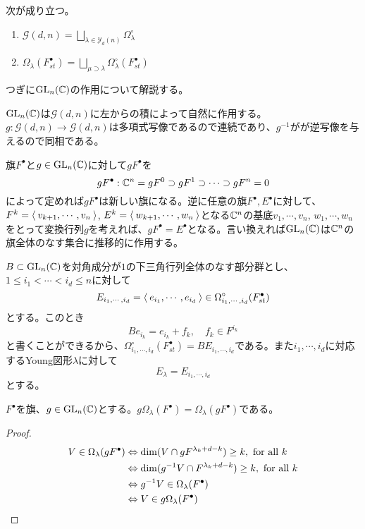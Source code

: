 \documentclass{ltjsreport}
\begin{document}
\begin{cor}
  次が成り立つ。
  \begin{enumerate}
    \item $\mathcal{G}(d,n)=\bigsqcup_{\lambda\in\mathcal{Y}_d(n)}\Omega_{\lambda}^\circ$
    \item $\Omega_{\lambda}(F^\bullet_{st})=\bigsqcup_{\mu\supset\lambda}\Omega_{\lambda}^\circ(F^\bullet_{st})$
  \end{enumerate}
\end{cor}





つぎに$\text{GL}_n(\mathbb{C})$の作用について解説する。

$\text{GL}_n(\mathbb{C})$は$\mathcal{G}(d,n)$に左からの積によって自然に作用する。$g:\mathcal{G}(d,n)\rightarrow\mathcal{G}(d,n)$は多項式写像であるので連続であり、$g^{-1}$がが逆写像を与えるので同相である。

旗$F^\bullet$と$g\in\text{GL}_n(\mathbb{C})$に対して$gF^\bullet$を
\[
gF^\bullet:\mathbb{C}^n=gF^0\supset gF^1\supset\cdots\supset gF^n=0
\]
によって定めれば$gF^\bullet$は新しい旗になる。逆に任意の旗$F^\bullet,E^\bullet$に対して、$F^k=\langle\:v_{k+1},\cdots,v_n\:\rangle$, $E^k=\langle\:w_{k+1},\cdots,w_n\:\rangle$となる$\mathbb{C}^n$の基底$v_1,\cdots,v_n$, $w_1,\cdots,w_n$をとって変換行列$g$を考えれば、$gF^\bullet =E^\bullet$となる。言い換えれば$\text{GL}_n(\mathbb{C})$は$\mathbb{C}^n$の旗全体のなす集合に推移的に作用する。

$B\subset\text{GL}_n(\mathbb{C})$を対角成分が$1$の下三角行列全体のなす部分群とし、$1\leq i_1<\cdots<i_d\leq n$に対して
\[
E_{i_1,\cdots,i_d}=\langle\:e_{i_1},\cdots,e_{i_d}\:\rangle\in\Omega_{i_1,\cdots,i_d}^\circ(F^\bullet_{st}) 
\]
とする。このとき
\[
Be_{i_k}=e_{i_k}+f_k,\quad f_k\in F^{i_k}  
\]
と書くことができるから、$\Omega_{i_1,\cdots,i_d}^\circ(F^\bullet_{st})=BE_{i_1,\cdots,i_d}$である。また$i_1,\cdots,i_d$に対応するYoung図形$\lambda$に対して
\[
E_\lambda=E_{i_1,\cdots,i_d}  
\]
とする。

\begin{prop}\label{flag_schubert}
  $F^\bullet$を旗、$g\in\text{GL}_n(\mathbb{C})$とする。$g\Omega_\lambda(F^\bullet)=\Omega_{\lambda}(gF^\bullet)$である。  
\end{prop}

\begin{proof}
  \begin{align*}
    V\in\Omega_\lambda(gF^\bullet)
    &\Leftrightarrow \dim(V\cap gF^{\lambda_k+d-k})\geq k, \text{ for all $k$ }\\
    &\Leftrightarrow \dim(g^{-1}V\cap F^{\lambda_k+d-k})\geq k, \text{ for all $k$}\\
    &\Leftrightarrow g^{-1}V\in \Omega_{\lambda}(F^\bullet)\\
    &\Leftrightarrow V\in g\Omega_{\lambda}(F^\bullet)
  \end{align*}
\end{proof}
\end{document}
